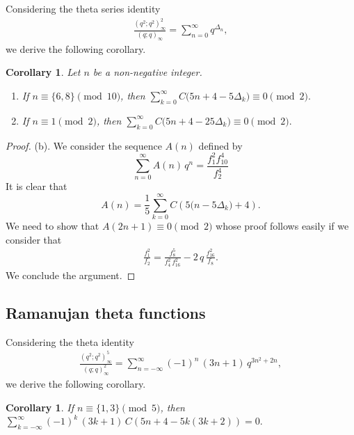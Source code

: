 \documentclass{article}
\newtheorem{corollary}[theorem]{Corollary}
\begin{document}
\noindent
Considering the theta series identity \cite[Eq. (0.45), p. 16]{Cooper}
\begin{align*}
\frac{(q^2;q^2)_\infty^2}{(q;q)_\infty} =  \sum_{n=0}^\infty q^{\Delta_n},
\end{align*}
we derive the following corollary.

\medskip
\begin{corollary} 
	Let $n$ be a non-negative integer.
	\begin{enumerate}
		\item [(a)]	If $n\equiv \{6,8\} \pmod{10}$, then 	
		$
		\sum\limits_{k=0}^\infty C\Big(5n+4-5\Delta_k\Big)  \equiv 0 \pmod 2.
		$
		\item [(b)]	If $n\equiv 1 \pmod{2}$, then 	
		$
		\sum\limits_{k=0}^\infty C\Big(5n+4-25\Delta_k\Big)  \equiv 0 \pmod 2.
		$
	\end{enumerate}
\end{corollary}
\medskip

\begin{proof}
	(b). We consider the sequence $A(n)$ defined by
	$$
	\sum_{n=0}^\infty A(n)\,q^n = \frac{f_1^2 f_{10}^4}{f_2^4}
	$$
	It is clear that
	$$
	A(n)=\frac{1}{5} \sum_{k=0}^\infty C\left(5\Big(n-5\Delta_k\Big)+4\right).
	$$
	We need to show that
	$A(2n+1)\equiv 0 \pmod 2$ whose proof follows easily if we consider that
	\begin{align*}
	\frac{f_1^2}{f_2} 
	= \frac{f_8^5}{f_4^2\,f_{16}^2}
	-2\,q\,\frac{f_{16}^2}{f_8}.
	\end{align*}
We conclude the argument.
\end{proof}

\subsection{Ramanujan theta functions}

Considering the theta identity \cite[Eq. (0.47), p. 17, with $q$ replaced by $-q$]{Cooper}
\begin{align*}
\frac{(q^2;q^2)_\infty^5}{(q;q)_\infty^2}
= \sum_{n=-\infty}^{\infty} (-1)^n\,(3n+1)\,q^{3n^2+2n}, 
\end{align*}
we derive the following corollary.

\medskip
\begin{corollary} 
If $n\equiv \{1,3\} \pmod {5}$, then	$\sum\limits_{k=-\infty}^\infty (-1)^k\,(3k+1)\, C\left(5n+4-5k(3k+2)\right)
		= 0.
		$
\end{corollary}
\medskip
\end{document}
